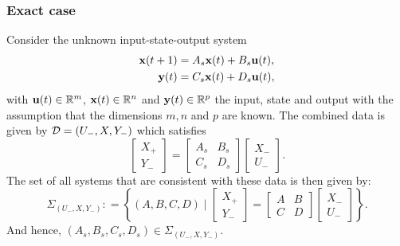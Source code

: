 \subsubsection{Exact case}
Consider the unknown input-state-output system
\bse\label{ch5:e:tru-sys}
\begin{align}
\mathbf{x}(t+1)&=A_{s} \mathbf{x}(t)+B_{s} \mathbf{u}(t),\\
\mathbf{y}(t)&=C_{s} \mathbf{x}(t)+D_{s} \mathbf{u}(t),  \end{align}
\ese
with $\mathbf{u}(t) \in \mathbb{R}^m$, $\mathbf{x}(t) \in \mathbb{R}^n$ and $\mathbf{y}(t) \in\mathbb{R}^{p}$ the input, state and output 
with the assumption that the dimensions $m,n$ and $p$ are known. The combined data is given by $\mathcal{D} = (U_-,X,Y_-)$ which satisfies
\begin{equation}  \label{ch5:e:true system compatible}
\begin{bmatrix}
X_+ \\ Y_-
\end{bmatrix} = \begin{bmatrix}
A_s & B_s \\ C_s & D_s
\end{bmatrix} \begin{bmatrix}
X_- \\ U_-
\end{bmatrix}.
\end{equation}
The set of all systems that are consistent with these data is then given by: 
\begin{equation}
\label{ch5:eq:sigma iso}
\Sigma_{(U_-,X,Y_-)}: = \left\{ (A,B,C,D) \mid \begin{bmatrix} X_+ \\ Y_- \end{bmatrix} = \begin{bmatrix} A & B \\ C & D \end{bmatrix} \begin{bmatrix} X_- \\ U_- \end{bmatrix} \right\}.
\end{equation}
And hence, $(A_s,B_s,C_s,D_s) \in \Sigma_{(U_-,X,Y_-)}$.
